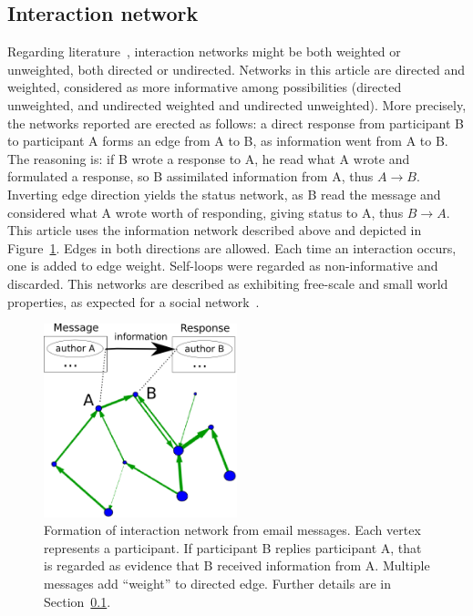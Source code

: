 \documentclass[%
 aip,
 jmp,%
 amsmath,amssymb,
 reprint,%
]{revtex4-1}
\begin{document}
    \subsection{Interaction network}\label{intNet}
Regarding literature~\cite{bird,newmanCommunityDirected,newmanCommunity2013}, interaction networks might be both weighted or unweighted, both directed or undirected. Networks in this article are directed and weighted, considered as more informative among possibilities (directed unweighted, and undirected weighted and undirected unweighted).
More precisely, the networks reported are erected as follows: a direct response from participant B to participant A forms an edge from A to B, as information went from A to B. The reasoning is: if B wrote a response to A, he read what A wrote and formulated a response, so B assimilated information from A, thus $A \rightarrow B$. Inverting edge direction yields the status network, as B read the message and considered what A wrote worth of responding, giving status to A, thus $B\rightarrow A$. This article uses the information network described above and depicted in Figure~\ref{formationNetwork}. Edges in both directions are allowed. Each time an interaction occurs, one is added to edge weight. Self-loops were regarded as non-informative and discarded. This networks are described as exhibiting free-scale and small world properties, as expected for a social network~\cite{bird}.

\begin{figure}[hb]
    \centering
    \includegraphics[width=0.5\textwidth]{figs/criaRede_}
    \caption{Formation of interaction network from email messages. Each vertex represents a participant. If participant B replies participant A, that is regarded as evidence that B received information from A. Multiple messages add ``weight'' to directed edge. Further details are in Section~\ref{intNet}.}
    \label{formationNetwork}
\end{figure}
\end{document}
